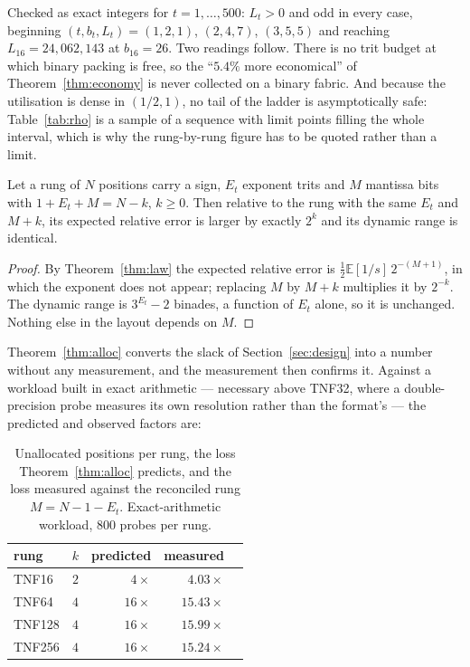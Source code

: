 Checked as exact integers for $t=1,\dots,500$: $L_t>0$ and odd in every case,
beginning $(t,b_t,L_t)=(1,2,1)$, $(2,4,7)$, $(3,5,5)$ and reaching
$L_{16}=24{,}062{,}143$ at $b_{16}=26$. Two readings follow. There is no trit
budget at which binary packing is free, so the ``$5.4\%$ more economical'' of
Theorem~\ref{thm:economy} is never collected on a binary fabric. And because the
utilisation is dense in $(1/2,1)$, no tail of the ladder is asymptotically safe:
Table~\ref{tab:rho} is a sample of a sequence with limit points filling the whole
interval, which is why the rung-by-rung figure has to be quoted rather than a
limit.

\begin{theorem}
\label{thm:alloc}
Let a rung of $N$ positions carry a sign, $E_t$ exponent trits and $M$ mantissa
bits with $1 + E_t + M = N - k$, $k \geq 0$. Then relative to the rung with the
same $E_t$ and $M + k$, its expected relative error is larger by exactly $2^{k}$
and its dynamic range is identical.
\end{theorem}

\begin{proof}
By Theorem~\ref{thm:law} the expected relative error is
$\tfrac12 \mathbb{E}[1/s]\,2^{-(M+1)}$, in which the exponent does not appear;
replacing $M$ by $M+k$ multiplies it by $2^{-k}$. The dynamic range is
$3^{E_t}-2$ binades, a function of $E_t$ alone, so it is unchanged. Nothing else in
the layout depends on $M$.
\end{proof}

Theorem~\ref{thm:alloc} converts the slack of Section~\ref{sec:design} into a
number without any measurement, and the measurement then confirms it. Against a
workload built in exact arithmetic --- necessary above TNF32, where a
double-precision probe measures its own resolution rather than the format's ---
the predicted and observed factors are:

\begin{table}[t]\centering
\caption{Unallocated positions per rung, the loss Theorem~\ref{thm:alloc}
predicts, and the loss measured against the reconciled rung
$M = N - 1 - E_t$. Exact-arithmetic workload, 800 probes per rung.}
\label{tab:alloc}
\begin{tabular}{lrrrr}
\toprule
rung & $k$ & predicted & measured \\
\midrule
TNF16  & $2$ & $4\times$  & $4.03\times$  \\
TNF64  & $4$ & $16\times$ & $15.43\times$ \\
TNF128 & $4$ & $16\times$ & $15.99\times$ \\
TNF256 & $4$ & $16\times$ & $15.24\times$ \\
\bottomrule
\end{tabular}
\end{table}

